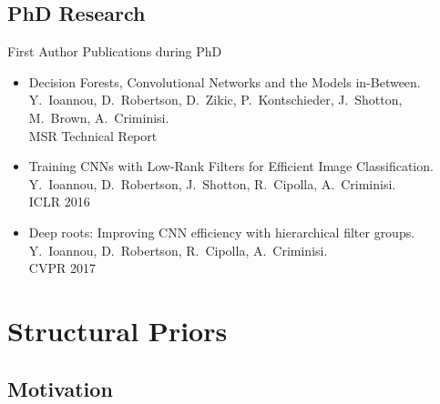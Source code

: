 \documentclass[t,xcolor=dvipsnames]{beamer}
\begin{document}
\usebackgroundtemplate{}

\subsection{PhD Research}

\begin{frame}{First Author Publications during PhD}
\begin{itemize}
    \item Decision Forests, Convolutional Networks and the Models in-Between.\\{\footnotesize Y.\ Ioannou, D.\ Robertson, D.\ Zikic, P.\ Kontschieder, J.\ Shotton, M.\ Brown, A.\ Criminisi.\\MSR Technical Report} 
    \item Training CNNs with Low-Rank Filters for Efficient Image Classification.\\{\footnotesize Y.\ Ioannou, D.\ Robertson, J.\ Shotton, R.\ Cipolla, A.\ Criminisi. \\ICLR 2016}
    \item Deep roots: Improving CNN efficiency with hierarchical filter groups.\\{\footnotesize Y.\ Ioannou, D.\ Robertson, R.\ Cipolla, A.\ Criminisi.\\CVPR 2017}
    
\end{itemize}
\end{frame}

\section{Structural Priors}
\subsection{Motivation}

\end{document}
